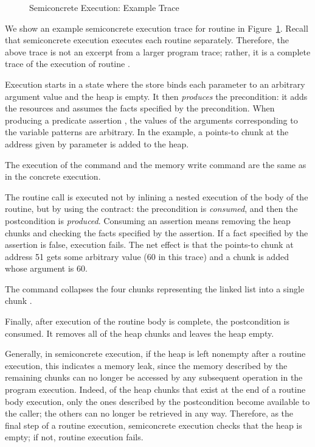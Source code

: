 \documentclass{CSML}
\theoremstyle{definition}\newtheorem{notation}[thm]{Notation}
\theoremstyle{plain}\newtheorem{satz}[thm]{Satz}
\begin{document}
\begin{figure}

\caption{Semiconcrete Execution: Example Trace}\label{fig:scexec-trace}
\end{figure}

We show an example semiconcrete execution trace for routine 
 in Figure~\ref{fig:scexec-trace}. Recall that semiconcrete execution 
executes each routine separately. Therefore, the above trace is 
not an excerpt from a larger program trace; rather, it is a 
complete trace of the execution of routine .

Execution starts in a state where the store binds each 
parameter to an arbitrary argument value and the heap is empty. 
It then \emph{produces} the precondition: it adds the resources 
and assumes the facts specified by the precondition. When 
producing a predicate assertion , the values of the arguments corresponding to the variable patterns 
are arbitrary. In the example, a 
points-to chunk at the address given by parameter 
 is added to the heap.

The execution of the  command and the memory 
write command are the same as in the concrete execution. 

The routine call is executed not by inlining a nested execution 
of the body of the routine, but by using the contract: the 
precondition is \emph{consumed}, and then the postcondition is 
\emph{produced}. Consuming an assertion means removing the heap 
chunks and checking the facts specified by the assertion. If a 
fact specified by the assertion is false, execution fails. The 
net effect is that the points-to chunk at address 51 gets some 
arbitrary value (60 in this trace) and a  chunk 
is added whose argument is 60.

The  command collapses the four chunks 
representing the linked list into a single chunk 
.

Finally, after execution of the routine body is complete, the 
postcondition is consumed. It removes all of the heap chunks 
and leaves the heap empty.

Generally, in semiconcrete execution, if the heap is left 
nonempty after a routine execution, this indicates a memory 
leak, since the memory described by the remaining chunks can no 
longer be accessed by any subsequent operation in the program 
execution. Indeed, of the heap chunks that exist at the end of 
a routine body execution, only the ones described by the 
postcondition become available to the caller; the others can no 
longer be retrieved in any way. Therefore, as the final step of 
a routine execution, semiconcrete execution checks that the 
heap is empty; if not, routine execution fails.
\end{document}
